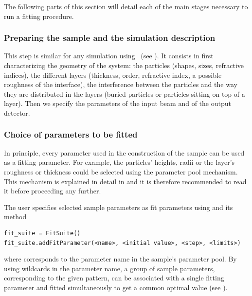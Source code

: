 The following parts of this section will detail each of
the main stages necessary to run a fitting procedure.


\subsubsection{Preparing the sample and the simulation description}

This step is similar for any simulation using \BornAgain\ (see ). It consists in first characterizing  the geometry of the system: the particles 
(shapes, sizes, refractive
indices), the different layers (thickness,
order, refractive index, a possible roughness of the interface), the
interference between the particles and the way they are distributed in
the layers (buried particles or particles sitting on top of a
layer). 
Then we specify the parameters of the input beam and of the
output detector.


\subsubsection{Choice of parameters to be fitted}

In principle, every parameter used in the construction of the sample
can be used as a fitting parameter. For example, the particles'
heights, radii or the layer's roughness or thickness could be selected
using the 
parameter pool mechanism. 
This mechanism is explained in detail in
 and it is therefore recommended
to read it before proceeding any further.

The user specifies selected sample parameters as fit parameters using 
and its  method
\begin{lstlisting}[language=shell, style=commandline]
fit_suite = FitSuite()
fit_suite.addFitParameter(<name>, <initial value>, <step>, <limits>)
\end{lstlisting}
where  corresponds to the parameter name in the sample's parameter pool.
By using wildcards in the parameter name, a group of sample parameters, corresponding to the given
pattern, can be associated with a single fitting parameter and 
fitted simultaneously to get a common optimal value (see ).

